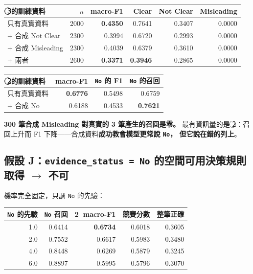 \documentclass[11pt,a4paper]{ctexart}
\newcommand{\fn}[1]{\texttt{#1}}
\begin{document}
\begin{table}[h]
\centering\small
\begin{tabular}{@{}lrrrrr@{}}
\toprule
\textcircled{3}的訓練資料 & $n$ & macro-F1 & Clear & Not Clear & Misleading \\
\midrule
只有真實資料 & 2000 & \textbf{0.4350} & 0.7641 & 0.3407 & 0.0000 \\
+ 合成 Not Clear & 2300 & 0.3994 & 0.6720 & 0.2993 & 0.0000 \\
+ 合成 Misleading & 2300 & 0.4039 & 0.6379 & 0.3610 & 0.0000 \\
+ 兩者 & 2600 & \textbf{0.3371} & \textbf{0.3946} & 0.2865 & 0.0000 \\
\bottomrule
\end{tabular}
\end{table}

\begin{table}[h]
\centering\small
\begin{tabular}{@{}lrrr@{}}
\toprule
\textcircled{2}的訓練資料 & macro-F1 & \fn{No} 的 F1 & \fn{No} 的召回 \\
\midrule
只有真實資料 & \textbf{0.6776} & 0.5498 & 0.6759 \\
+ 合成 No & 0.6188 & 0.4533 & \textbf{0.7621} \\
\bottomrule
\end{tabular}
\end{table}

\textbf{300 筆合成 Misleading 對真實的 3 筆產生的召回是零。} 最有資訊量的是
\textcircled{2}：召回上升而 F1 下降——合成資料\textbf{成功教會模型更常說 \fn{No}，
但它說在錯的列上}。

\subsection*{假設 J：\fn{evidence\_status = No} 的空間可用決策規則取得 $\to$ 不可}

機率完全固定，只調 \fn{No} 的先驗：

\begin{table}[h]
\centering\small
\begin{tabular}{@{}rrrrr@{}}
\toprule
\fn{No} 的先驗 & \fn{No} 召回 & \textcircled{2} macro-F1 & 競賽分數 & 整筆正確 \\
\midrule
1.0 & 0.6414 & \textbf{0.6734} & 0.6018 & 0.3605 \\
2.0 & 0.7552 & 0.6617 & 0.5983 & 0.3480 \\
4.0 & 0.8448 & 0.6269 & 0.5879 & 0.3245 \\
6.0 & 0.8897 & 0.5995 & 0.5796 & 0.3070 \\
\bottomrule
\end{tabular}
\end{table}
\end{document}
